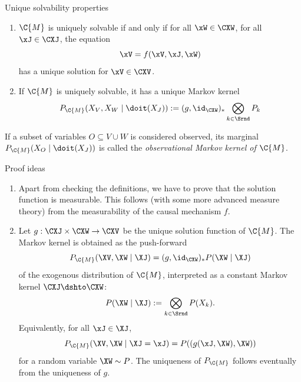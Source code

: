 \begin{frame}{Unique solvability properties}
\begin{theorem}
  \begin{enumerate}
    \item $\C{M}$ is uniquely solvable if and only if 
      for all $\xW\in\CXW$, for all $\xJ \in \CXJ$, the equation
      $$\xV = f(\xV,\xJ,\xW)$$
      has a unique solution for $\xV\in\CXV$.
    \item If $\C{M}$ is uniquely solvable, it has a unique Markov kernel
      $$P_{\C{M}}(X_V,X_W \mid \doit(X_J)) := (g,\id_{\CXW})_* \bigotimes_{k\in\Srnd} P_k$$
  \end{enumerate}
\end{theorem}
\begin{definition}
  If a subset of variables $O \subseteq V \cup W$ is considered observed, its marginal
  $P_{\C{M}}(X_O \mid \doit(X_J))$ is called the \emph{observational Markov kernel of $\C{M}$}.
\end{definition}
\end{frame}

\begin{frame}{Proof ideas}
  \begin{enumerate}
    \item Apart from checking the definitions, we have to prove that the solution function is measurable.
This follows (with some more advanced measure theory) from the measurability of the causal mechanism $f$.

    \item Let $g : \CXJ \times \CXW \to \CXV$ be the unique solution function of $\C{M}$.
      The Markov kernel is obtained as the push-forward
      $$P_{\C{M}}(\XV,\XW \mid \XJ) = (g,\id_{\CXW})_* P(\XW \mid \XJ)$$
      of the exogenous distribution of $\C{M}$, interpreted as a constant Markov kernel $\CXJ \dshto \CXW$:
  $$P(\XW \mid \XJ) := \bigotimes_{k\in\Srnd} P(X_k).$$
  Equivalently, for all $\xJ \in \XJ$,
      $$P_{\C{M}}(\XV,\XW \mid \XJ=\xJ) = P((g(\xJ,\XW),\XW))$$
      for a random variable $\XW \sim P$. The uniqueness of $P_{\C{M}}$ follows eventually from the uniqueness of $g$.
  \end{enumerate}
\end{frame}

